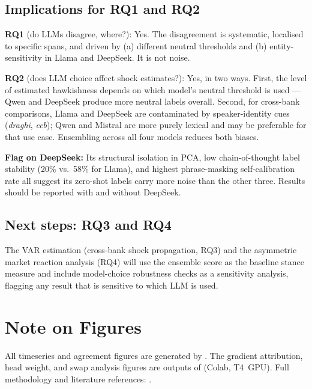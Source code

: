 \documentclass[11pt,a4paper]{article}
\begin{document}
\subsection{Implications for RQ1 and RQ2}

\textbf{RQ1} (do LLMs disagree, where?): Yes. The disagreement is systematic,
localised to specific spans, and driven by (a) different neutral thresholds
and (b) entity-sensitivity in Llama and DeepSeek. It is not noise.

\textbf{RQ2} (does LLM choice affect shock estimates?): Yes, in two ways.
First, the level of estimated hawkishness depends on which model's neutral
threshold is used --- Qwen and DeepSeek produce more neutral labels overall.
Second, for cross-bank comparisons, Llama and DeepSeek are contaminated by
speaker-identity cues (\textit{draghi}, \textit{ecb}); Qwen and Mistral are
more purely lexical and may be preferable for that use case. Ensembling
across all four models reduces both biases.

\textbf{Flag on DeepSeek:} Its structural isolation in PCA, low chain-of-thought
label stability (20\% vs.\ 58\% for Llama), and highest phrase-masking
self-calibration rate all suggest its zero-shot labels carry more noise than
the other three. Results should be reported with and without DeepSeek.

\subsection{Next steps: RQ3 and RQ4}

The VAR estimation (cross-bank shock propagation, RQ3) and the asymmetric
market reaction analysis (RQ4) will use the ensemble score as the baseline
stance measure and include model-choice robustness checks as a sensitivity
analysis, flagging any result that is sensitive to which LLM is used.

\section*{Note on Figures}
All timeseries and agreement figures are generated by
. The gradient attribution,
head weight, and swap analysis figures are outputs of
 (Colab, T4~GPU).
Full methodology and literature references: .
\end{document}
